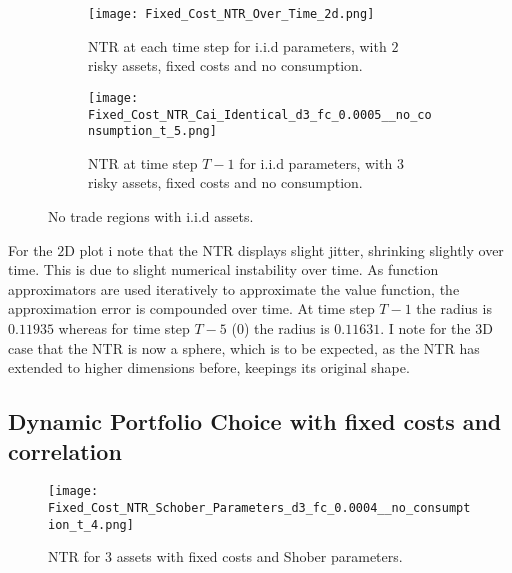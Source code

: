 \documentclass[11pt]{article}
\begin{document}
\begin{figure}[!ht]
    \centering
    \begin{subfigure}[t]{0.48\textwidth}
        \centering
        \texttt{[image: Fixed\_Cost\_NTR\_Over\_Time\_2d.png]}
        \caption{NTR at each time step for i.i.d parameters, with $2$ risky assets, fixed costs and no consumption.}
        \label{fig:NTR_2d_iid_over_time}
    
    \end{subfigure}%
    \hfill
    \begin{subfigure}[t]{0.48\textwidth}
        \centering
        \texttt{[image: Fixed\_Cost\_NTR\_Cai\_Identical\_d3\_fc\_0.0005\_\_no\_consumption\_t\_5.png]}
        \caption{NTR at time step $T-1$ for i.i.d parameters, with $3$ risky assets, fixed costs and no consumption.}
        \label{fig:NTR_3d_iid_T-1}
    \end{subfigure}
    \caption{No trade regions with i.i.d assets.}
\end{figure}
For the $2$D plot i note that the NTR displays slight jitter, shrinking slightly over time. This is due to slight numerical instability over time. As function approximators
are used iteratively to approximate the value function, the approximation error is compounded over time. At time step $T-1$ the radius is $0.11935$ whereas for time step $T-5$ ($0$) the radius is $0.11631$.
I note for the $3$D case that the NTR is now a sphere, which is to be expected, as the NTR has extended to higher dimensions before, keepings its original shape.

\subsection{Dynamic Portfolio Choice with fixed costs and correlation}


\begin{figure}[!ht]
    \centering
    \texttt{[image: Fixed\_Cost\_NTR\_Schober\_Parameters\_d3\_fc\_0.0004\_\_no\_consumption\_t\_4.png]}
    \caption{NTR for 3 assets with fixed costs and Shober parameters.}
    \label{fig: NTR_Fixed_3d_Shober}
\end{figure}

\ifdefined\COMPILINGMAIN
\else
\end{document}
